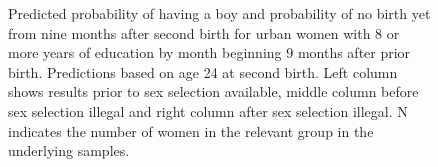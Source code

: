 \documentclass[12pt,letterpaper]{article}
\begin{document}
\begin{figure}[htpb]
\setcounter{subfigure}{3}
\caption{Predicted probability of having a boy and probability of
no birth yet from nine months after second birth for urban 
women with 8 or more years of education by month beginning 9 months after prior birth. 
Predictions based on age 24 at second birth.
Left column shows results prior to sex selection available, middle column before
sex selection illegal and right column after sex selection illegal.
N indicates the number of women in the relevant group in the underlying samples.
}
\label{fig:results_spell4_high_urban}
\end{figure}
\end{document}
